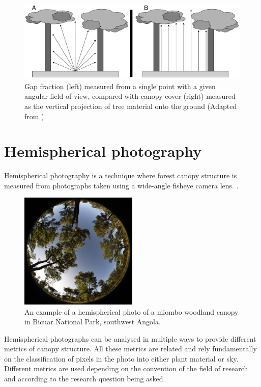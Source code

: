 \documentclass[11pt,a4paper]{article}
\begin{document}
\begin{figure}[H]
\centering
	\includegraphics[width=\textwidth]{closure.drawio.pdf}
	\caption{Gap fraction (left) measured from a single point with a given angular field of view, compared with canopy cover (right) measured as the vertical projection of tree material onto the ground (Adapted from \citealt{Jennings1999}).}
	\label{closure}
\end{figure}

\section{Hemispherical photography}

Hemispherical photography is a technique where forest canopy structure is measured from photographs taken using a wide-angle fisheye camera lens. \citep{Seidel2011, Macfarlane2014}. 

\begin{figure}[H]
\centering
	\includegraphics[width=0.5\textwidth]{hemi.jpg}
	\caption{An example of a hemispherical photo of a miombo woodland canopy in Bicuar National Park, southwest Angola.}
	\label{hemi}
\end{figure}

Hemispherical photographs can be analysed in multiple ways to provide different metrics of canopy structure. All these metrics are related and rely fundamentally on the classification of pixels in the photo into either plant material or sky. Different metrics are used depending on the convention of the field of research and according to the research question being asked. 
\end{document}
